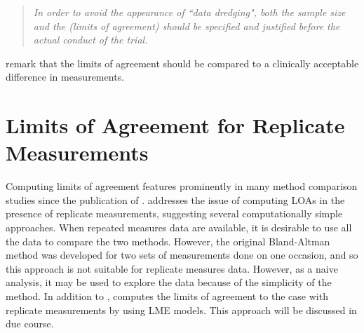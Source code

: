 \documentclass[12pt, a4paper]{report}
\theoremstyle{plain}
\theoremstyle{definition}
\theoremstyle{remark}
\begin{document}
\begin{quote}
\textit{In order to avoid the appearance of ``data dredging", both the
	sample size and the (limits of agreement) should be specified and
	justified before the actual conduct of the trial.} \citep{lin}
\end{quote}

\citet{Dewitte} remark that the limits of agreement should be
compared to a clinically acceptable difference in measurements.

\section{Limits of Agreement for Replicate Measurements}

Computing limits of agreement features prominently in many method comparison studies since the publication of \citet{BA86}.
\citet{BA99} addresses the issue of computing LOAs in the presence of replicate measurements, suggesting several computationally simple approaches. When repeated measures data are available, it is desirable to use
all the data to compare the two methods. However, the original Bland-Altman method was developed for two sets of measurements done on one occasion, and so this approach is not suitable for replicate measures data. However, as a naive analysis, it may be used to explore the data because of the simplicity of the method.
In addition to \citet{BA99}, \citet{BXC2008} computes the limits of agreement to the case with replicate measurements by using LME models. This approach will be discussed in due course.



	
\end{document}
